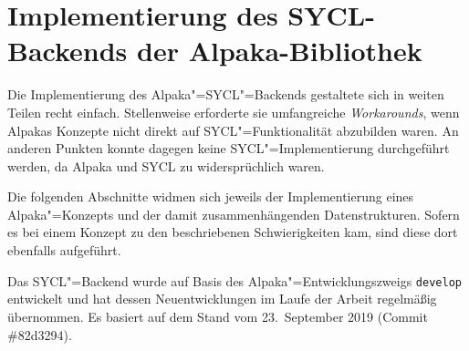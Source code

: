 \chapter{Implementierung des SYCL-Backends der Alpaka-Bibliothek}
\label{implementierung}

Die Implementierung des Alpaka"=SYCL"=Backends gestaltete sich in weiten Teilen
recht einfach. Stellenweise erforderte sie umfangreiche \textit{Workarounds},
wenn Alpakas Konzepte nicht direkt auf SYCL"=Funktionalität abzubilden waren.
An anderen Punkten konnte dagegen keine SYCL"=Implementierung durchgeführt
werden, da Alpaka und SYCL zu widersprüchlich waren.

Die folgenden Abschnitte widmen sich jeweils der Implementierung eines
Alpaka"=Konzepts und der damit zusammenhängenden Datenstrukturen. Sofern es bei
einem Konzept zu den beschriebenen Schwierigkeiten kam, sind diese dort
ebenfalls aufgeführt.

Das SYCL"=Backend wurde auf Basis des Alpaka"=Entwicklungszweigs
\texttt{develop} entwickelt und hat dessen Neuentwicklungen im Laufe der Arbeit
regelmäßig übernommen. Es basiert auf dem Stand vom 23.\ September 2019
(Commit \#82d3294).

